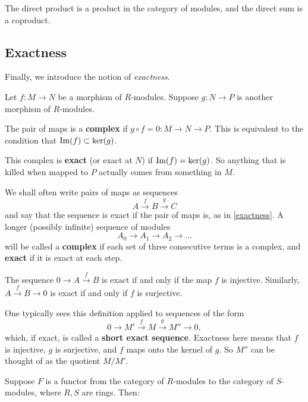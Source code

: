 \begin{exercise} 
The direct product is a product in the category of modules, and the direct sum
is a coproduct.
\end{exercise} 


\subsection{Exactness}
Finally, we introduce the notion of \emph{exactness}. 
\begin{definition} \label{exactness}
Let $f: M \to N$ be a morphism of $R$-modules.  Suppose $g: N \to P$ is another morphism of
$R$-modules.  

The pair of maps is a \textbf{complex} if $g \circ f = 0: M \to N \to P$.
This is equivalent to the condition that $\operatorname{Im}(f) \subset \ker(g)$. 

This complex is \textbf{exact} (or exact at $N$) if $\operatorname{Im}(f) = \ker(g)$. So
anything that is killed when mapped to $P$ actually comes from something in
$M$. 

\end{definition} 


We shall often write pairs of maps as sequences
\[ A \stackrel{f}{\to} B \stackrel{g}{\to} C  \]
and say that the sequence is exact if the pair of maps is, as in
\cref{exactness}. A longer (possibly infinite) sequence of modules
\[ A_0 \to A_1 \to A_2 \to \dots  \]
will be called a \textbf{complex} if each set of three
consecutive terms is a complex, and \textbf{exact} if it is exact at each step.

\begin{example} 
The sequence $0 \to A \stackrel{f}{\to} B$ is exact if and only if the map $f$
is injective. Similarly, $A \stackrel{f}{\to} B \to 0$ is exact if and only if
$f$ is surjective. 
\end{example} 

One typically sees this definition applied to sequences of the form
\[ 0 \to M'\stackrel{f}{ \to} M \stackrel{g}{\to} M'' \to 0,  \]
which, if exact, is called a \textbf{short exact sequence}. 
Exactness here means that $f$ is injective, $g$ is surjective, and $f$ maps
onto the kernel of $g$.  So $M''$ can be thought of as the quotient $M/M'$.

Suppose   $F$ is a functor from the category of $R$-modules to the
category of  $S$-modules, where $R, S$ are rings.  Then:


